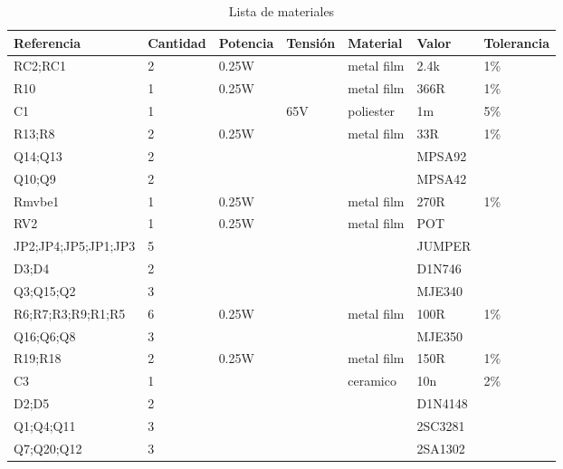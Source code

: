 \documentclass[a4paper,12pt,twoside]{article}
\begin{document}
\begin{table}[h!]
\centering
\caption{Lista de materiales}
\label{label}
\begin{tabular}{@{}lllllll@{}}
\toprule
Referencia            & Cantidad & Potencia  & Tensión   &  Material  & Valor    & Tolerancia \\ \midrule
RC2;RC1               & 2        &  0.25W    &           &  metal film& 2.4k     & 1\% \\
R10                   & 1        &  0.25W    &           &  metal film& 366R     & 1\% \\
C1                    & 1        &           & 65V       &  poliester & 1m       & 5\% \\
R13;R8                & 2        &  0.25W    &           &  metal film& 33R      & 1\% \\
Q14;Q13               & 2        &           &           &            & MPSA92   &     \\
Q10;Q9                & 2        &           &           &            & MPSA42   &     \\
Rmvbe1                & 1        &  0.25W    &           &  metal film& 270R     & 1\% \\
RV2                   & 1        &  0.25W    &           &  metal film& POT      &     \\
JP2;JP4;JP5;JP1;JP3   & 5        &           &           &            & JUMPER   &     \\
D3;D4                 & 2        &           &           &            & D1N746   &     \\
Q3;Q15;Q2             & 3        &           &           &            & MJE340   &     \\
R6;R7;R3;R9;R1;R5     & 6        &  0.25W    &           &  metal film& 100R     & 1\% \\
Q16;Q6;Q8             & 3        &           &           &            & MJE350   &     \\
R19;R18               & 2        &  0.25W    &           &  metal film& 150R     & 1\% \\
C3                    & 1        &           &           &  ceramico  & 10n      & 2\% \\
D2;D5                 & 2        &           &           &            & D1N4148  &     \\
Q1;Q4;Q11             & 3        &           &           &            & 2SC3281  &     \\
Q7;Q20;Q12            & 3        &           &           &            & 2SA1302  &     \\

\end{tabular}
\end{table}
\end{document}
